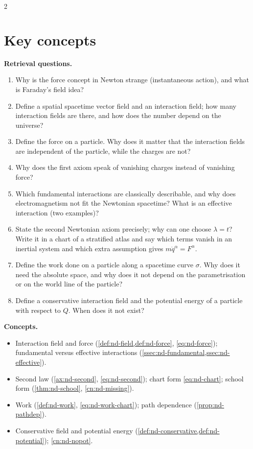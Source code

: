 \begin{paracol}{2}
\section*{Key concepts}
\begin{keyconcepts}
\textbf{Retrieval questions.}
\begin{enumerate}
  \item Why is the force concept in Newton strange (instantaneous action), and what is Faraday's field idea?
  \item Define a spatial spacetime vector field and an interaction field; how many interaction fields are there, and how does the number depend on the universe?
  \item Define the force on a particle. Why does it matter that the interaction fields are independent of the particle, while the charges are not?
  \item Why does the first axiom speak of vanishing charges instead of vanishing force?
  \item Which fundamental interactions are classically describable, and why does electromagnetism not fit the Newtonian spacetime? What is an effective interaction (two examples)?
  \item State the second Newtonian axiom precisely; why can one choose $\lambda=t$? Write it in a chart of a stratified atlas and say which terms vanish in an inertial system and which extra assumption gives $m\ddot q^\alpha=F^\alpha$.
  \item Define the work done on a particle along a spacetime curve $\sigma$. Why does it need the absolute space, and why does it not depend on the parametrisation or on the world line of the particle?
  \item Define a conservative interaction field and the potential energy of a particle with respect to $Q$. When does it not exist?
\end{enumerate}
\textbf{Concepts.}
\begin{itemize}
  \item Interaction field and force (\cref{def:nd-field,def:nd-force}, \eqref{eq:nd-force}); fundamental versus effective interactions (\cref{ssec:nd-fundamental,ssec:nd-effective}).
  \item Second law (\cref{ax:nd-second}, \eqref{eq:nd-second}); chart form \eqref{eq:nd-chart}; school form (\cref{thm:nd-school}, \cref{cn:nd-missing}).
  \item Work (\cref{def:nd-work}, \eqref{eq:nd-work-chart}); path dependence (\cref{prop:nd-pathdep}).
  \item Conservative field and potential energy (\cref{def:nd-conservative,def:nd-potential}); \cref{cn:nd-nopot}.
\end{itemize}
\end{keyconcepts}

\flushside
\end{paracol}
